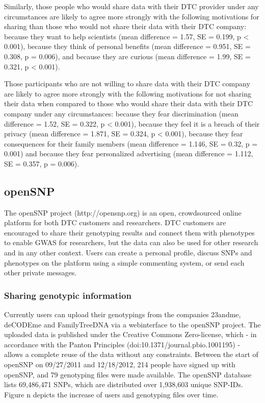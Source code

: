 \documentclass[10pt]{article}
\begin{document}
Similarly, those people who would share data with their DTC provider under any circumstances are likely to agree more strongly with 
the following motivations for sharing than those who would not share their data with their DTC company: because they want to help 
scientists (mean difference = 1.57, SE = 0.199, p < 0.001), because they think of personal benefits (mean difference = 0.951, SE = 0.308, p = 0.006), 
and because they are curious (mean difference = 1.99, SE = 0.321, p < 0.001). 

Those participants who are not willing to share data with their DTC company are likely to agree more strongly with the following motivations 
for not sharing their data when compared to those who would share their data with their DTC company under any circumstances: because they 
fear discrimination (mean difference = 1.52, SE = 0.322, p < 0.001), because they feel it is a breach of their privacy (mean difference = 1.871, SE = 0.324, p < 0.001), 
because they fear consequences for their family members (mean difference = 1.146, SE = 0.32, p = 0.001) and because they fear personalized advertising (mean difference =  1.112, SE = 0.357, p = 0.006). 

\subsection*{openSNP}

The openSNP project (http://opensnp.org) is an open, crowdsourced online platform for both DTC customers and researchers. 
DTC customers are encouraged to share their genotyping results and connect them with phenotypes to enable GWAS for researchers,
but the data can also be used for other research and in any other context.  
Users can create a personal profile, discuss SNPs and phenotypes on the 
platform using a simple commenting system, or send each other private messages. 


\subsubsection*{Sharing genotypic information}
Currently users can upload their genotypings from the companies 23andme, deCODEme and FamilyTreeDNA via a webinterface to the openSNP 
project. The uploaded data is published under the Creative Commons Zero-license, 
which - in accordance with the Panton Principles (doi:10.1371/journal.pbio.1001195) - 
allows a complete reuse of the data without any constraints.
Between the start of openSNP on 09/27/2011 and 12/18/2012, 214 people have signed 
up with openSNP, and 79 genotyping files were made available. The openSNP 
database lists 69,486,471 SNPs, which are distributed over 1,938,603 unique SNP-IDs.
Figure n depicts the increase of users and genotyping files over time.
\end{document}
